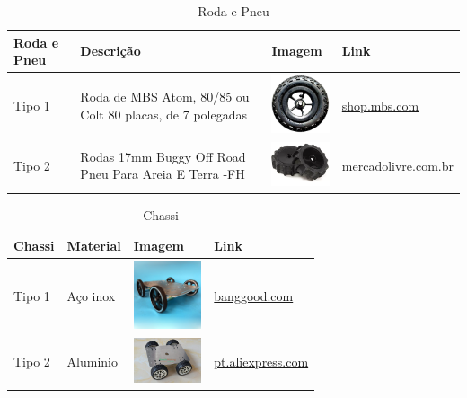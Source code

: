   \begin{table}[!htbp]
  \begin{center}
  \caption{Roda e Pneu}
  \begin{tabular}{|p{2cm}|p{3cm}|p{2cm}|p{4cm}|}
  \hline
  \textbf{Roda e Pneu} & \textbf{Descrição} & \textbf{Imagem} & \textbf{Link}\\\hline\hline
  Tipo 1 & Roda de MBS Atom, 80/85 ou Colt 80 placas, de 7 polegadas & \includegraphics[width=2cm]{figuras/roda_mbs.jpg} & \href{http://shop.mbs.com/accessories-488/mountainboard-wheels/complete-wheels/complete-7-wheel.html}{shop.mbs.com}\\\hline
  Tipo 2 & Rodas 17mm Buggy Off Road Pneu Para Areia E Terra -FH & \includegraphics[width=2cm]{figuras/roda_buggy.jpg} & \href{http://produto.mercadolivre.com.br/MLB-788601174-par-de-rodas-17mm-buggy-off-road-pneu-para-areia-e-terra-fh-_JM}{mercadolivre.com.br}\\\hline
  \end{tabular}
  \end{center}
  \end{table}

  \begin{table}[!htbp]
  \begin{center}
  \caption{Chassi}
  \begin{tabular}{|p{2cm}|p{3cm}|p{2cm}|p{4cm}|}
  \hline
  \textbf{Chassi} & \textbf{Material} & \textbf{Imagem} & \textbf{Link}\\\hline\hline
  Tipo 1 & Aço inox & \includegraphics[width=2cm]{figuras/chassi_inox.jpg} & \href{http://www.banggood.com/pt/DIY-C600-DIY-Remote-Control-Crawler-Chassis-Smart-Track-Stainless-Stell-Metal-Tank-p-1079216.html}{banggood.com}\\\hline
  Tipo 2 & Aluminio & \includegraphics[width=2cm]{figuras/chassi_aluminio.jpg} & \href{https://pt.aliexpress.com/store/product/New-25-aluminum-alloy-tracking-robot-tank-chassi-car-4WD-metal-tank-car-chassis-for-DIY/421824_32294898374.html}{pt.aliexpress.com}\\\hline
  \end{tabular}
  \end{center}
  \end{table}

